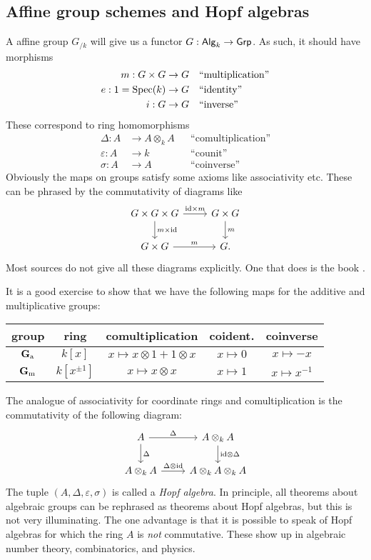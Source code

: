 \subsection{Affine group schemes and Hopf algebras}

A affine group $G_{/k}$ will give us a functor $G:\mathsf{Alg}_{k}\to \mathsf{Grp}$. As 
such, it should have morphisms 
\begin{align*}
  m :G\times G &\to G && \text{``multiplication''} \\
  e:1=\operatorname{Spec}(k) &\to G && \text{``identity''} \\
  i:G &\to G && \text{``inverse''}
\end{align*}
These correspond to ring homomorphisms 
\begin{align*}
  \Delta:A &\to A\otimes_k A && \text{``comultiplication''} \\
  \varepsilon : A &\to k && \text{``counit''} \\
  \sigma:A &\to A && \text{``coinverse''}
\end{align*}
Obviously the maps on groups satisfy some axioms like associativity etc. These 
can be phrased by the commutativity of diagrams like 
\[\begin{tikzcd}
  G\times G\times G \ar[r, "\id\times m"] \ar[d, "m\times \id"] 
    & G\times G \ar[d, "m"] \\ 
  G\times G \ar[r, "m"] 
    & G .
\end{tikzcd}\]
Most sources do not give all these diagrams explicitly. One that does is 
the book \cite{waterhouse-1979}. 

It is a good exercise to show that we have the following maps for the additive 
and multiplicative groups:
\begin{center}
\begin{tabular}{c|cccc}
group & ring & comultiplication & coident. & coinverse \\ \hline
$\mathbf{G}_\mathrm{a}$ & $k[x]$ & $x\mapsto x\otimes 1+1\otimes x$ & $x\mapsto 0$ & $x\mapsto -x$ \\
$\mathbf{G}_\mathrm{m}$ & $k[x^{\pm 1}]$ & $x\mapsto x\otimes x$ & $x\mapsto 1$ & $x\mapsto x^{-1}$
\end{tabular}
\end{center}
The analogue of associativity for coordinate rings and comultiplication is the 
commutativity of the following diagram:
\[\begin{tikzcd}
  A \ar[r, "\Delta"] \ar[d, "\Delta"] 
    & A\otimes_k A \ar[d, "\id\otimes \Delta"] \\
  A\otimes_k A \ar[r, "\Delta\otimes \id"] 
    & A\otimes_k A\otimes_k A
\end{tikzcd}\]
The tuple $(A,\Delta,\varepsilon,\sigma)$ is called a \emph{Hopf algebra}. In 
principle, all theorems about algebraic groups can be rephrased as theorems 
about Hopf algebras, but this is not very illuminating. The one advantage is 
that it is possible to speak of Hopf algebras for which the ring $A$ is 
\emph{not} commutative. These show up in algebraic number theory, combinatorics, 
and physics. 

